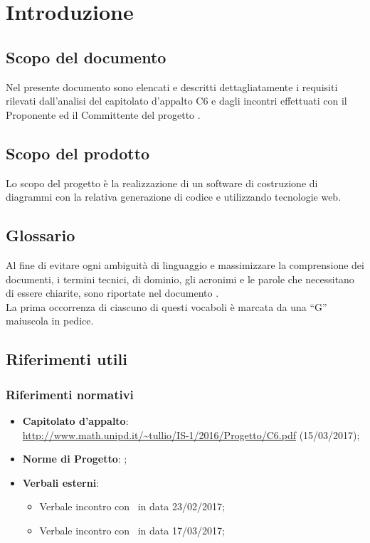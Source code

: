 \documentclass[../AnalisiDeiRequisiti.tex]{subfiles}
\begin{document}
	\section{Introduzione}
		\subsection{Scopo del documento}
			Nel presente documento sono elencati e descritti dettagliatamente i requisiti
			rilevati dall'analisi del capitolato d'appalto C6 e dagli incontri effettuati
			con il Proponente ed il Committente del progetto \progetto.
		\subsection{Scopo del prodotto}
			Lo scopo del progetto è la realizzazione di un software di
			costruzione di diagrammi  con la relativa generazione
			di codice  e  utilizzando tecnologie
			web.
		\subsection{Glossario}
			Al fine di evitare ogni ambiguità di linguaggio e massimizzare la
			comprensione dei documenti, i termini tecnici, di dominio, gli
			acronimi e le parole che necessitano di essere chiarite, sono
			riportate nel documento \glossariov.\\
			La prima occorrenza di ciascuno di questi vocaboli è
			marcata da una ``G'' maiuscola in pedice.
		\subsection{Riferimenti utili}
			\subsubsection{Riferimenti normativi}
    			\begin{itemize}
    				\item \textbf{Capitolato d'appalto}:\\
					\url{http://www.math.unipd.it/~tullio/IS-1/2016/Progetto/C6.pdf} (15/03/2017);
					\item \textbf{Norme di Progetto}: \normediprogettov;
    				\item \textbf{Verbali esterni}:
    					\begin{itemize}
    						\item Verbale incontro con \proponente\ in data 23/02/2017;
    						\item Verbale incontro con \proponente\ in data 17/03/2017;
    					\end{itemize}
				\end{itemize}
\end{document}
